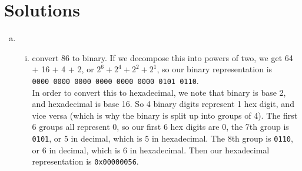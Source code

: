 \documentclass{article}
\newcommand{\code}[1]{{\tt{}#1}}
\begin{document}
\section{Solutions}
\begin{enumerate}[(a)]
\item
\begin{enumerate}[i.]
\item convert 86 to binary. If we decompose this into powers of two, we get 64 + 16 + 4 + 2, or $2^6 + 2^4 + 2^2 + 2^1$, so our binary representation is\\\code{0000 0000 0000 0000 0000 0000 0101 0110}.\\In order to convert this to hexadecimal, we note that binary is base 2, and hexadecimal is base 16. So 4 binary digits represent 1 hex digit, and vice versa (which is why the binary is split up into groups of 4). The first 6 groups all represent 0, so our first 6 hex digits are 0, the 7th group is \code{0101}, or 5 in decimal, which is 5 in hexadecimal. The 8th group is \code{0110}, or 6 in decimal, which is 6 in hexadecimal. Then our hexadecimal representation is \code{0x00000056}.


\end{enumerate}
\end{enumerate}
\end{document}
